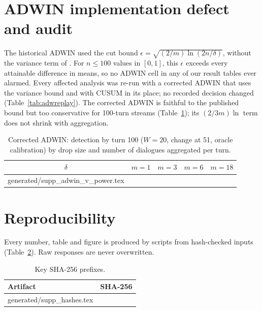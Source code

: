 \documentclass[10pt]{article}
\makeatletter
\newcommand{\inputtable}[1]{\@@input #1 }
\makeatother
\begin{document}
\section{ADWIN implementation defect and audit}
\label{sec:adwin}
The historical ADWIN used the cut bound $\epsilon=\sqrt{(2/m)\ln(2n/\delta)}$,
without the variance term of \citet{bifet2007learning}. For $n\le100$ values
in $[0,1]$, this $\epsilon$ exceeds every attainable difference in means, so no
ADWIN cell in any of our result tables ever alarmed. Every affected analysis
was re-run with a corrected ADWIN that uses the variance bound and with CUSUM
in its place; no recorded decision changed (Table~\ref{tab:adwreplay}). The
corrected ADWIN is faithful to the published bound but too conservative for
100-turn streams (Table~\ref{tab:adwv}); its $(2/3m)\ln$ term does not shrink
with aggregation.

\begin{table}[h]\centering\small
\caption{Corrected ADWIN: detection by turn 100 ($W=20$, change at 51, oracle
calibration) by drop size and number of dialogues aggregated per turn.}
\label{tab:adwv}
\begin{tabular}{ccccc}\toprule
$\delta$ & $m=1$ & $m=3$ & $m=6$ & $m=18$\\\midrule
\inputtable{generated/supp_adwin_v_power.tex}
\bottomrule\end{tabular}\end{table}

\section{Reproducibility}
Every number, table and figure is produced by scripts from hash-checked inputs
(Table~\ref{tab:hash}). Raw responses are never overwritten.

\begin{table}[h]\centering\small
\caption{Key SHA-256 prefixes.}\label{tab:hash}
\begin{tabular}{ll}\toprule Artifact & SHA-256\\\midrule
\inputtable{generated/supp_hashes.tex}
\bottomrule\end{tabular}\end{table}



\end{document}
